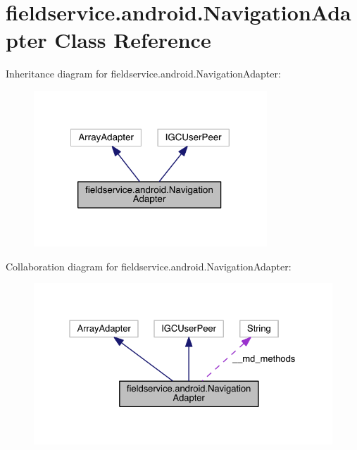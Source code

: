 \hypertarget{classfieldservice_1_1android_1_1_navigation_adapter}{\section{fieldservice.\+android.\+Navigation\+Adapter Class Reference}
\label{classfieldservice_1_1android_1_1_navigation_adapter}
}


Inheritance diagram for fieldservice.\+android.\+Navigation\+Adapter\+:
\nopagebreak
\begin{figure}[H]
\begin{center}
\leavevmode
\includegraphics[width=248pt]{classfieldservice_1_1android_1_1_navigation_adapter__inherit__graph}
\end{center}
\end{figure}


Collaboration diagram for fieldservice.\+android.\+Navigation\+Adapter\+:
\nopagebreak
\begin{figure}[H]
\begin{center}
\leavevmode
\includegraphics[width=327pt]{classfieldservice_1_1android_1_1_navigation_adapter__coll__graph}
\end{center}
\end{figure}
